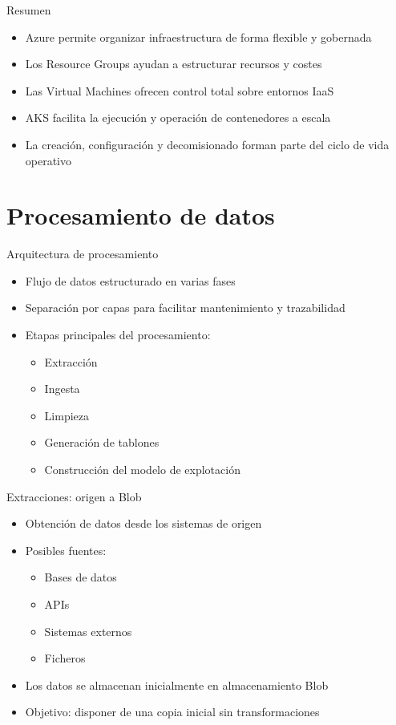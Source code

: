 \documentclass{beamer}
\begin{document}
\begin{frame}{Resumen}
\begin{itemize}
    \item Azure permite organizar infraestructura de forma flexible y gobernada
    \item Los Resource Groups ayudan a estructurar recursos y costes
    \item Las Virtual Machines ofrecen control total sobre entornos IaaS
    \item AKS facilita la ejecución y operación de contenedores a escala
    \item La creación, configuración y decomisionado forman parte del ciclo de vida operativo
\end{itemize}
\end{frame}

\section{Procesamiento de datos}

\begin{frame}{Arquitectura de procesamiento}
\begin{itemize}
    \item Flujo de datos estructurado en varias fases
    \item Separación por capas para facilitar mantenimiento y trazabilidad
    \item Etapas principales del procesamiento:
    \begin{itemize}
        \item Extracción
        \item Ingesta
        \item Limpieza
        \item Generación de tablones
        \item Construcción del modelo de explotación
    \end{itemize}
\end{itemize}
\end{frame}

\begin{frame}{Extracciones: origen a Blob}
\begin{itemize}
    \item Obtención de datos desde los sistemas de origen
    \item Posibles fuentes:
    \begin{itemize}
        \item Bases de datos
        \item APIs
        \item Sistemas externos
        \item Ficheros
    \end{itemize}
    \item Los datos se almacenan inicialmente en almacenamiento Blob
    \item Objetivo: disponer de una copia inicial sin transformaciones
\end{itemize}
\end{frame}
\end{document}
